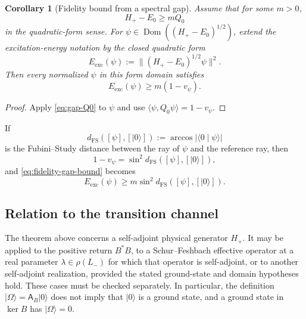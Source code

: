 \documentclass[11pt,reqno]{scrartcl}
\newcommand{\Aop}{\mathsf A}
\newcommand{\ket}[1]{\lvert #1\rangle}
\newcommand{\braket}[2]{\langle #1\mid #2\rangle}
\newcommand{\inner}[2]{\langle #1,#2\rangle}
\DeclareMathOperator{\Dom}{Dom}
\theoremstyle{plain}
\newtheorem{corollary}[corollary]{Corollary}
\theoremstyle{definition}
\theoremstyle{remark}
\begin{document}
\begin{corollary}[Fidelity bound from a spectral gap]
\label{cor:fidelity-gap}
Assume that for some \(m>0\),
\begin{equation}
  H_+-E_0\ge mQ_0
  \label{eq:gap-Q0}
\end{equation}
in the quadratic-form sense.  For \(\psi\in\Dom((H_+-E_0)^{1/2})\), extend the excitation-energy
notation by the closed quadratic form
\begin{equation}
  E_{\mathrm{exc}}(\psi)
  :=\bigl\|(H_+-E_0)^{1/2}\psi\bigr\|^2.
  \label{eq:Eexc-form-domain}
\end{equation}
Then every normalized \(\psi\) in this form domain satisfies
\begin{equation}
  \boxed{
  E_{\mathrm{exc}}(\psi)\ge m(1-v_\psi).}
  \label{eq:fidelity-gap-bound}
\end{equation}
\end{corollary}

\begin{proof}
Apply \eqref{eq:gap-Q0} to \(\psi\) and use
\(\inner\psi{Q_0\psi}=1-v_\psi\).
\end{proof}

If
\begin{equation}
  d_{\mathrm{FS}}([\psi],[\ket0])
  :=\arccos|\braket0\psi|
  \label{eq:FS-distance}
\end{equation}
is the Fubini--Study distance between the ray of \(\psi\) and the reference ray, then
\begin{equation}
  1-v_\psi=\sin^2 d_{\mathrm{FS}}([\psi],[\ket0]),
\end{equation}
and \eqref{eq:fidelity-gap-bound} becomes
\begin{equation}
  E_{\mathrm{exc}}(\psi)
  \ge m\sin^2 d_{\mathrm{FS}}([\psi],[\ket0]).
  \label{eq:FS-gap-bound}
\end{equation}

\subsection{Relation to the transition channel}

The theorem above concerns a self-adjoint physical generator \(H_+\).  It may
be applied to the positive return \(B^*B\), to a Schur--Feshbach effective
operator at a real parameter \(\lambda\in\rho(L_-)\) for which that operator
is self-adjoint, or to another self-adjoint realization, provided the stated
ground-state and domain hypotheses hold.  These cases
must be checked separately.  In particular, the definition
\(\ket\Omega=\Aop_B\ket0\) does not imply that \(\ket0\) is a ground state,
and a ground state in \(\ker B\) has \(\ket\Omega=0\).
\end{document}
